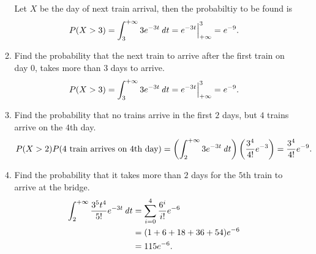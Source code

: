 \begin{enumerate}
\begin{enumerate}
    Let \(X\) be the day of next train arrival, then the probabiltiy to be found is
    \[P(X > 3) = \int_3^{+\infty} 3e^{-3t} \mathop{}\!\mathit{d} t = e^{-3t}\Bigr\vert_{+\infty}^3 = e^{-9}.\]

  \item Find the probability that the next train to arrive after the
    first train on day \(0\), takes more than \(3\) days to arrive.
    \[P(X > 3) = \int_3^{+\infty} 3e^{-3t} \mathop{}\!\mathit{d} t = e^{-3t}\Bigr\vert_{+\infty}^3 = e^{-9}.\]

  \item Find the probability that no trains arrive in the first \(2\)
    days, but \(4\) trains arrive on the \(4\)th day.
    \[P(X > 2) P(4 \text{ train arrives on } 4 \text{th day})
      = \left( \int_2^{+\infty} 3e^{-3t} \mathop{}\!\mathit{d} t \right) \left( \frac{3^4}{4!}e^{-3} \right)
      = \frac{3^4}{4!} e^{-9}.\]

  \item Find the probability that it takes more than \(2\) days for the
    \(5\)th train to arrive at the bridge.
    \begin{align*}
      \int_2^{+\infty} \frac{3^5 t^4}{5!} e^{-3t} \mathop{}\!\mathit{d} t
      &= \sum_{i=0}^{4} \frac{6^i}{i!} e^{-6} \\
      &= (1 + 6 + 18 + 36 + 54) e^{-6} \\
      &= 115e^{-6}.
    \end{align*}
  \end{enumerate}
\end{enumerate}

